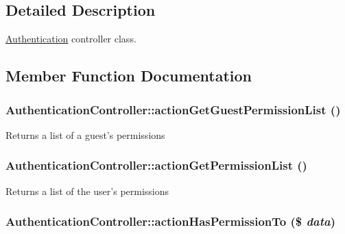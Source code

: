\subsection{Detailed Description}
\hyperlink{classAuthentication}{Authentication} controller class. 

\subsection{Member Function Documentation}
\hypertarget{classAuthenticationController_a3c194770ce772109bdd389a2ca284ccb}{
\subsubsection[{actionGetGuestPermissionList}]{\setlength{\rightskip}{0pt plus 5cm}AuthenticationController::actionGetGuestPermissionList ()}}
\label{classAuthenticationController_a3c194770ce772109bdd389a2ca284ccb}
Returns a list of a guest's permissions \hypertarget{classAuthenticationController_ac45eccdb761b3718d8d4789582b6aea6}{
\subsubsection[{actionGetPermissionList}]{\setlength{\rightskip}{0pt plus 5cm}AuthenticationController::actionGetPermissionList ()}}
\label{classAuthenticationController_ac45eccdb761b3718d8d4789582b6aea6}
Returns a list of the user's permissions \hypertarget{classAuthenticationController_a157fcb263bbb409a114ac940c2abfed0}{
\subsubsection[{actionHasPermissionTo}]{\setlength{\rightskip}{0pt plus 5cm}AuthenticationController::actionHasPermissionTo (\$ {\em data})}}
\label{classAuthenticationController_a157fcb263bbb409a114ac940c2abfed0}
